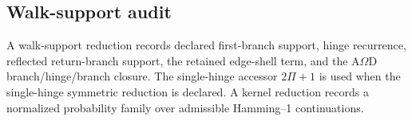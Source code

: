 \subsection{Walk-support audit}\label{app:rd-tests:audit}
A walk-support reduction records declared first-branch support, hinge recurrence, reflected return-branch support, the retained edge-shell term, and the A\(\Omega\)D branch/hinge/branch closure. The single-hinge accessor \(2\Pi+1\) is used when the single-hinge symmetric reduction is declared. A kernel reduction records a normalized probability family over admissible Hamming--1 continuations.

